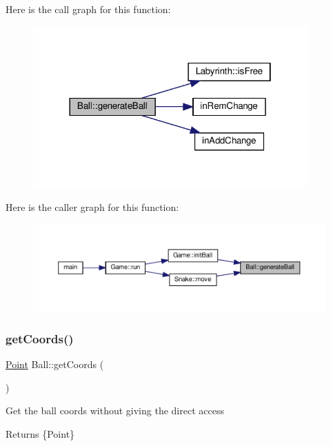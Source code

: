Here is the call graph for this function\+:
\nopagebreak
\begin{figure}[H]
\begin{center}
\leavevmode
\includegraphics[width=298pt]{class_ball_a60fd40459426366242d18d85b3b50c2c_cgraph}
\end{center}
\end{figure}
Here is the caller graph for this function\+:
\nopagebreak
\begin{figure}[H]
\begin{center}
\leavevmode
\includegraphics[width=350pt]{class_ball_a60fd40459426366242d18d85b3b50c2c_icgraph}
\end{center}
\end{figure}
\mbox{\label{class_ball_a14b9a607402be58e7a0a0ab053df5f82}} 
\subsubsection{\texorpdfstring{getCoords()}{getCoords()}}
{\footnotesize\ttfamily \mbox{\hyperlink{common_8h_aa9cfdb80b4ca12013a2de8a3b9b97981}{Point}} Ball\+::get\+Coords (\begin{DoxyParamCaption}{ }\end{DoxyParamCaption})}

Get the ball coords without giving the direct access \begin{DoxyReturn}{Returns}
\{Point\} 
\end{DoxyReturn}


